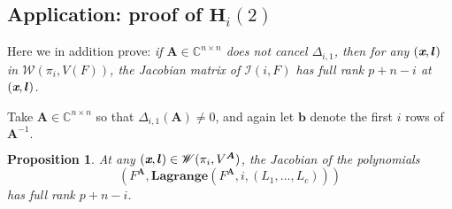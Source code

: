 \documentclass[a4paper]{article}
\def\A{\mathfrak{A}}
\def\mA{{\bm A}}
\def\lb{{\bm l}}
\def\xb{\textit{\textbf{x}}}
\def\D{\Delta}
\def\C{\mathbb{C}}
\def\lagFA{{\bm{Lagrange}}(F^{\mA},i,(L_1,\hdots,L_c))}
\def\WilAnu{\mathscr{W}(\pi_i,V^{\mA})}
\newtheorem{prop}[theorem]{Proposition}
\begin{document}
%






\subsection{Application: proof of $\textbf{H}_i(2)$}\label{Hi2}
Here we in addition prove: \textit{if $\mA
    \in \C^{n\times n}$ does not cancel $\D_{i,1}$, then for any $(\xb,\lb)$ in $\mathscr{W}(\pi_i,V(F))$, the Jacobian matrix of $\mathscr{I}(i,F)$ has full rank $p+n-i$ at $(\xb,\lb)$.}    
    \par 
    Take $\mA \in \C^{n \times n}$ so that $\Delta_{i,1}(\mA) \not = 0$, and again let $\bm b$ denote the first $i$ rows of $\mA^{-1}.$
    \begin{prop}\label{prop:LagIdeal}
    At any $(\xb,\lb) \in \WilAnu$, the Jacobian of the polynomials 
    \[
    \left(F^{\mA},\lagFA\right)
    \]
    has full rank $p+n-i$. 
    \end{prop}
\end{document}
